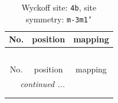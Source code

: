 \documentclass[fleqn,8pt]{jsarticle}
\begin{document}
\renewcommand{\arraystretch}{1.2}
\begin{longtable}{ccc}
\caption{Wyckoff site: {\tt 4b}, site symmetry: {\tt m-3m1'}}
 \\
 \hline \hline
No. & position & mapping \\ \hline \endfirsthead

\multicolumn{2}{l}{\tablename\ \thetable{}} \\
 \hline \hline
No. & position & mapping \\ \hline \endhead

 \hline \hline
\multicolumn{2}{r}{\footnotesize\it continued ...} \\ \endfoot

 \hline \hline
\multicolumn{2}{r}{} \\ \endlastfoot


\end{longtable}
\end{document}
